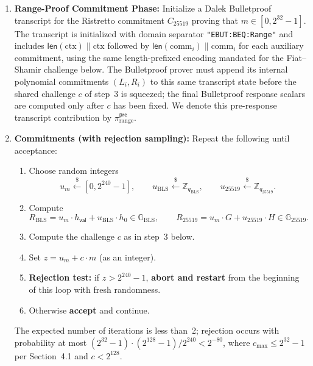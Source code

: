 \documentclass[11pt]{article}
\theoremstyle{definitionstyle}
\theoremstyle{plain}
\begin{document}
\begin{enumerate}[leftmargin=*]
\item \textbf{Range-Proof Commitment Phase:}
  Initialize a Dalek Bulletproof transcript for the Ristretto commitment $C_{25519}$ proving that $m \in [0, 2^{32}-1]$. The transcript is initialized with domain separator \texttt{"EBUT:BEQ:Range"} and includes $\mathsf{len}(\text{ctx}) \parallel \text{ctx}$ followed by $\mathsf{len}(\text{comm}_i) \parallel \text{comm}_i$ for each auxiliary commitment, using the same length-prefixed encoding mandated for the Fiat--Shamir challenge below. The Bulletproof prover must append its internal polynomial commitments $(L_i,R_i)$ to this same transcript state before the shared challenge $c$ of step~3 is squeezed; the final Bulletproof response scalars are computed only after $c$ has been fixed. We denote this pre-response transcript contribution by $\pi_{\text{range}}^{\mathsf{pre}}$.

\item \textbf{Commitments (with rejection sampling):}
  Repeat the following until acceptance:
  \begin{enumerate}
  \item Choose random integers
    \[
    u_m \xleftarrow{\$} [0, 2^{240}-1], \qquad
    u_{\text{BLS}} \xleftarrow{\$} \mathbb{Z}_{q_{\text{BLS}}}, \qquad
    u_{25519} \xleftarrow{\$} \mathbb{Z}_{q_{25519}}.
    \]
  \item Compute
    \[
    R_{\text{BLS}} = u_m \cdot h_{\mathsf{val}} + u_{\text{BLS}} \cdot h_0 \in \mathbb{G}_{\text{BLS}}, \qquad
    R_{25519} = u_m \cdot G + u_{25519} \cdot H \in \mathbb{G}_{25519}.
    \]
  \item Compute the challenge $c$ as in step~3 below.
  \item Set $z = u_m + c \cdot m$ (as an integer).
  \item \textbf{Rejection test:} if $z > 2^{240}-1$, \textbf{abort and restart} from the beginning of this loop with fresh randomness.
  \item Otherwise \textbf{accept} and continue.
  \end{enumerate}
  The expected number of iterations is less than~2; rejection occurs with probability at most $(2^{32}-1) \cdot (2^{128}-1) / 2^{240} < 2^{-80}$, where $c_{\max} \le 2^{32}-1$ per Section~4.1 and $c < 2^{128}$.


\end{enumerate}
\end{document}
